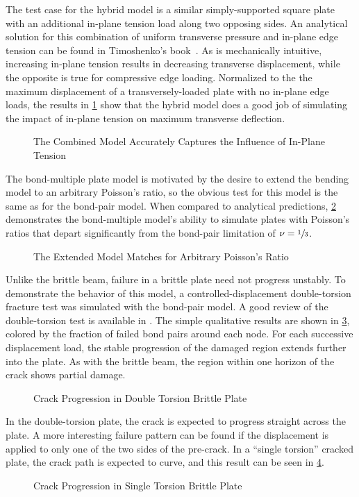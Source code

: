 The test case for the hybrid model is a similar simply-supported square plate with an additional in-plane tension load along two opposing sides.  An analytical solution for this combination of uniform transverse pressure and in-plane edge tension can be found in Timoshenko's book~\cite{timoshenko1959theory}.  As is mechanically intuitive, increasing in-plane tension results in decreasing transverse displacement, while the opposite is true for compressive edge loading.  Normalized to the the maximum displacement of a transversely-loaded plate with no in-plane edge loads, the results in \cref{fig:plateStiffening} show that the hybrid model does a good job of simulating the impact of in-plane tension on maximum transverse deflection.
%
\begin{figure}[tbp]
  \centering
  \resizebox{0.6\linewidth}{!}{}
  \caption{The Combined Model Accurately Captures the Influence of In-Plane Tension}
  \label{fig:plateStiffening}
\end{figure}
%
The bond-multiple plate model is motivated by the desire to extend the bending model to an arbitrary Poisson's ratio, so the obvious test for this model is the same as for the bond-pair model. When compared to analytical predictions, \cref{fig:plate_poisson} demonstrates the bond-multiple model's ability to simulate plates with Poisson's ratios that depart significantly from the bond-pair limitation of $\nu = \sfrac{1}{3}$.
%
\begin{figure}[tbp]
  \centering
  \resizebox{0.6\linewidth}{!}{}
  \caption{The Extended Model Matches for Arbitrary Poisson's Ratio}
  \label{fig:plate_poisson}
\end{figure}
%

Unlike the brittle beam, failure in a brittle plate need not progress unstably. To demonstrate the behavior of this model, a controlled-displacement double-torsion fracture test was simulated with the bond-pair model. A good review of the double-torsion test is available in \cite{shyam2006double}. The simple qualitative results are shown in \cref{fig:DTdamage}, colored by the fraction of failed bond pairs around each node. For each successive displacement load, the stable progression of the damaged region extends further into the plate. As with the brittle beam, the region within one horizon of the crack shows partial damage.
%
\begin{figure}[tbp]
  \centering
  \resizebox{0.6\linewidth}{!}{}
  \caption{Crack Progression in Double Torsion Brittle Plate}
  \label{fig:DTdamage}
\end{figure}
%
In the double-torsion plate, the crack is expected to progress straight across the plate.
A more interesting failure pattern can be found if the displacement is applied to only one of the two sides of the pre-crack.
In a ``single torsion'' cracked plate, the crack path is expected to curve, and this result can be seen in \cref{fig:SingleTorsion}.
%
\begin{figure}[tbp]
  \centering
  \resizebox{0.6\linewidth}{!}{}
  \caption{Crack Progression in Single Torsion Brittle Plate}
  \label{fig:SingleTorsion}
\end{figure}
%
